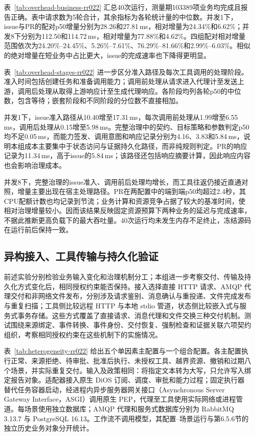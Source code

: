 表~\ref{tab:overhead-business-rr022} 汇总40次运行，测量期103389项业务均完成且报告正确。表中请求数为5轮合计，其余指标为各轮统计量的中位数。并发1下，issue与PR的配对p50增量分别为28.26和27.81\,ms，相对增量为24.34\%和6.62\%；并发8下分别为112.50和114.72\,ms，相对增量为77.88\%和4.62\%。四组配对相对增量范围依次为24.20\%--24.45\%、5.26\%--7.61\%、76.29\%--81.66\%和2.99\%--6.03\%。相似的绝对增量在短业务中占比更大，issue的完成速率也下降得更明显。



表~\ref{tab:overhead-stages-rr022} 进一步区分准入路径及每次工具调用的处理阶段。准入时间包括创建任务和准备调用能力；调用前处理从请求进入代理计至发送上游，调用后处理从取得上游响应计至生成代理响应。各阶段均列各轮p50的中位数，包含等待；嵌套阶段和不同阶段的分位数不直接相加。



并发1下，issue准入路径从10.40增至17.31\,ms，每次调用前处理从1.99增至6.55\,ms，调用后处理从0.15增至5.98\,ms。完整治理中的契约、目标策略和参数判定p50均不足0.05\,ms，而能力签发、调用意图和响应记录分别为4.16、3.83和5.84\,ms，说明本组成本主要集中于状态访问与证据持久化路径，而非纯规则判定。PR的响应记录为11.34\,ms，高于issue的5.84\,ms；该路径还包括响应摘要计算，因此响应内容也会影响治理成本。

并发8下，完整治理的issue准入、调用前后处理均增长，而工具往返仍接近直通对照，增量主要出现在宿主处理路径。PR在两配置中的端到端p50均超过2.4秒，其CPU配额计数也均记录到节流；业务计算和资源竞争占据了较大的基准时间，使相对治理增量较小。因而该结果反映固定资源预算下两种业务的延迟与完成速率，不据此推断更高负载下的最大吞吐量。40次运行均未发生内存不足终止，冻结源码在运行前后保持一致。

\subsection{异构接入、工具传输与持久化验证}
\label{sec:heterogeneity-rr022}

前述实验分别检验业务输入变化和治理机制分工；本组进一步考察交付、传输及持久化方式变化后，相同授权约束能否保持。接入选择直接 HTTP 请求、AMQP 代理交付和非网络文件发布，分别涉及请求鉴别、消息确认与重投递、文件完成发布与重复扫描；工具侧比较远程 HTTP 与本地 stdio 管道，状态侧比较嵌入式与服务式事务存储。这些方式覆盖了直接请求、消息代理和文件交换三种交付机制。测试围绕来源绑定、事件转换、事件身份、交付恢复、强制检查和证据关联六项契约组织，考察相同授权约束在这些机制下的实施情况。

表~\ref{tab:heterogeneity-rr022} 给出五个单因素主配置与一个组合配置。各主配置执行正常、来源拒绝、待审批、批准后执行、未授权工具、越界资源、撤销和过期八个场景，并实际重复交付。输入及政策相同：将指定文本转为大写，只允许写入绑定报告对象。适配器接入原生 DiOS 订阅、调度、审批和能力过程；固定执行器替代任务容器启动，经进程内异步服务器网关接口（Asynchronous Server Gateway Interface，ASGI）调用原生 PEP，代理至工具使用实际网络或进程管道。每场景使用独立数据库；AMQP 代理和服务式数据库分别为 RabbitMQ 3.13.7 与 PostgreSQL 16.13。工作流不调用模型，其配置--场景运行与第6.5.6节的独立历史业务对象分开统计。

